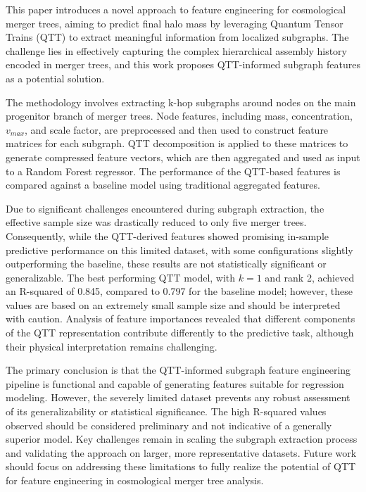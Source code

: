 \documentclass[twocolumn]{aastex631}
\begin{document}
This paper introduces a novel approach to feature engineering for cosmological merger trees, aiming to predict final halo mass by leveraging Quantum Tensor Trains (QTT) to extract meaningful information from localized subgraphs. The challenge lies in effectively capturing the complex hierarchical assembly history encoded in merger trees, and this work proposes QTT-informed subgraph features as a potential solution.

The methodology involves extracting k-hop subgraphs around nodes on the main progenitor branch of merger trees. Node features, including mass, concentration, \(v_{max}\), and scale factor, are preprocessed and then used to construct feature matrices for each subgraph. QTT decomposition is applied to these matrices to generate compressed feature vectors, which are then aggregated and used as input to a Random Forest regressor. The performance of the QTT-based features is compared against a baseline model using traditional aggregated features.

Due to significant challenges encountered during subgraph extraction, the effective sample size was drastically reduced to only five merger trees. Consequently, while the QTT-derived features showed promising in-sample predictive performance on this limited dataset, with some configurations slightly outperforming the baseline, these results are not statistically significant or generalizable. The best performing QTT model, with \(k=1\) and rank 2, achieved an R-squared of 0.845, compared to 0.797 for the baseline model; however, these values are based on an extremely small sample size and should be interpreted with caution. Analysis of feature importances revealed that different components of the QTT representation contribute differently to the predictive task, although their physical interpretation remains challenging.

The primary conclusion is that the QTT-informed subgraph feature engineering pipeline is functional and capable of generating features suitable for regression modeling. However, the severely limited dataset prevents any robust assessment of its generalizability or statistical significance. The high R-squared values observed should be considered preliminary and not indicative of a generally superior model. Key challenges remain in scaling the subgraph extraction process and validating the approach on larger, more representative datasets. Future work should focus on addressing these limitations to fully realize the potential of QTT for feature engineering in cosmological merger tree analysis.
\end{document}
